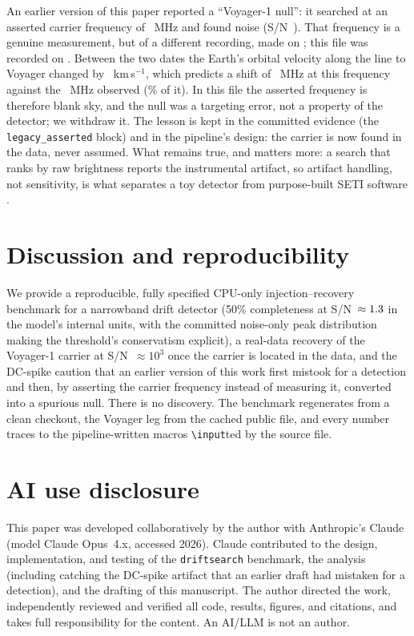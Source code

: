 \documentclass[twocolumn]{aastex631}
\newcommand{\code}[1]{\texttt{#1}}
\begin{document}
An earlier version of this paper reported a ``Voyager-1 null'': it searched at an asserted
carrier frequency of \dsVoyLegacyFreq~MHz \citep{estevez2021} and found noise
(S/N~\dsVoyLegacySnr). That frequency is a genuine measurement, but of a different recording,
made on \dsVoyLegacyDate; this file was recorded on \dsVoyFileDate. Between the two dates the
Earth's orbital velocity along the line to Voyager changed by \dsVoyDopplerDv~km\,s$^{-1}$, which
predicts a shift of \dsVoyDopplerPred~MHz at this frequency against the \dsVoyOffset~MHz observed
(\dsVoyDopplerPct\% of it). In this file the asserted frequency is therefore blank sky, and the
null was a targeting error, not a property of the detector; we withdraw it. The lesson is kept in the committed evidence (the \code{legacy\_asserted}
block) and in the pipeline's design: the carrier is now found in the data, never assumed. What
remains true, and matters more: a search that ranks by raw brightness reports the instrumental
artifact, so artifact handling, not sensitivity, is what separates a toy detector from
purpose-built SETI software \citep{enriquez2017}.

\section{Discussion and reproducibility}
We provide a reproducible, fully specified CPU-only injection--recovery benchmark for a
narrowband drift detector (50\% completeness at S/N~$\approx1.3$ in the model's internal
units, with the committed noise-only peak distribution making the threshold's conservatism
explicit), a real-data recovery of the Voyager-1 carrier at S/N~$\approx10^{3}$ once the carrier
is located in the data, and the DC-spike caution that an earlier version of this work first
mistook for a detection and then, by asserting the carrier frequency instead of measuring it,
converted into a spurious null. There is no discovery. The benchmark regenerates from a clean
checkout, the Voyager leg from the cached public file, and every number traces to the
pipeline-written macros \code{\textbackslash input}ted by the source file.

\section*{AI use disclosure}
This paper was developed collaboratively by the author with Anthropic's Claude
\citep{anthropicclaude} (model Claude Opus~4.x, accessed 2026). Claude contributed to the design,
implementation, and testing of the \code{driftsearch} benchmark, the analysis (including catching the
DC-spike artifact that an earlier draft had mistaken for a detection), and the drafting of this
manuscript. The author directed the work, independently reviewed and verified all code, results,
figures, and citations, and takes full responsibility for the content. An AI/LLM is not an author.
\end{document}
